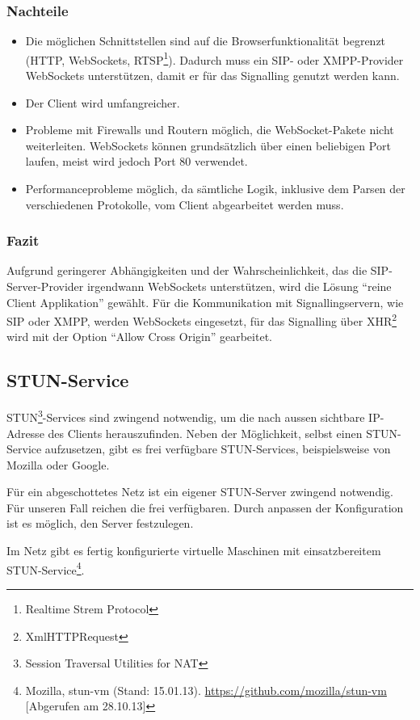 		\subsubsection{Nachteile}
		\begin{itemize}
			\item Die möglichen Schnittstellen sind auf die Browserfunktionalität
			begrenzt (HTTP, WebSockets, RTSP\footnote{Realtime Strem Protocol}). Dadurch
			muss ein SIP- oder XMPP-Provider WebSockets unterstützen, damit er für das
			Signalling genutzt werden kann.
			\item Der Client wird umfangreicher.
			\item Probleme mit Firewalls und Routern möglich, die WebSocket-Pakete nicht
			weiterleiten. WebSockets können grundsätzlich über einen beliebigen Port laufen, meist wird jedoch Port 80 verwendet.
			\item Performanceprobleme möglich, da sämtliche Logik, inklusive dem Parsen
			der verschiedenen Protokolle, vom Client abgearbeitet werden muss.
		\end{itemize}

		\subsubsection{Fazit}
			Aufgrund geringerer Abhängigkeiten und der Wahrscheinlichkeit, das die
			SIP-Server-Provider irgendwann WebSockets unterstützen, wird die Lösung
			"`reine Client Applikation"' gewählt.
			Für die Kommunikation mit Signallingservern, wie SIP oder XMPP, werden
			WebSockets eingesetzt, für das Signalling über XHR\footnote{XmlHTTPRequest}
			wird mit der Option "`Allow Cross Origin"' gearbeitet.

	\subsection{STUN-Service}
		STUN\footnote{Session Traversal Utilities for NAT}-Services sind zwingend
		notwendig, um die nach aussen sichtbare IP-Adresse des Clients herauszufinden.
		Neben der Möglichkeit, selbst einen STUN-Service aufzusetzen, gibt es frei
		verfügbare STUN-Services, beispielsweise von Mozilla oder Google.

		Für ein abgeschottetes Netz ist ein eigener STUN-Server zwingend notwendig.
		Für unseren Fall reichen die frei verfügbaren. Durch anpassen der
		Konfiguration ist es möglich, den Server festzulegen.

		Im Netz gibt es fertig konfigurierte virtuelle Maschinen mit einsatzbereitem
		STUN-Service\footnote{Mozilla, stun-vm (Stand: 15.01.13). \hyperlink{https://github.com/mozilla/stun-vm}{https://github.com/mozilla/stun-vm} [Abgerufen am 28.10.13]}.

